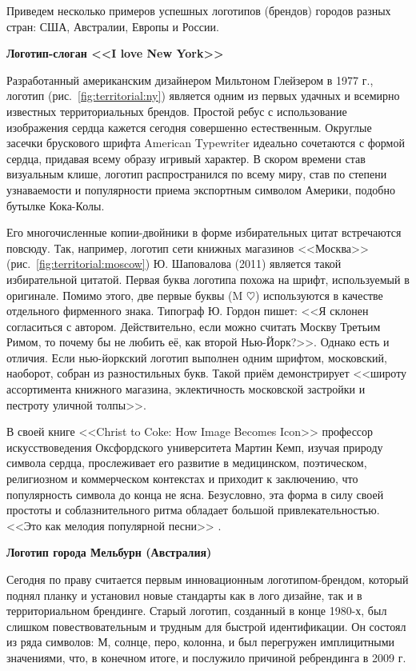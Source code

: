 Приведем несколько примеров успешных логотипов (брендов) городов разных стран: США, Австралии,
Европы и России.

\textbf{Логотип-слоган <<I love New York>>}

Разработанный американским дизайнером Мильтоном Глейзером в 1977 г., логотип
(рис.~\ref{fig:territorial:ny}) является одним из первых удачных и всемирно известных
территориальных брендов. Простой ребус с использование изображения сердца кажется сегодня совершенно
естественным. Округлые засечки брускового шрифта American Typewriter идеально сочетаются с формой
сердца, придавая всему образу игривый характер. В скором времени став визуальным клише, логотип
распространился по всему миру, став по степени узнаваемости и популярности приема экспортным
символом Америки, подобно бутылке Кока-Колы.

Его многочисленные копии-двойники в форме избирательных цитат встречаются повсюду. Так, например,
логотип сети книжных магазинов <<Москва>> (рис.~\ref{fig:territorial:moscow}) Ю. Шаповалова (2011)
является такой избирательной цитатой. Первая буква логотипа похожа на шрифт, используемый в
оригинале. Помимо этого, две первые буквы (M $\heartsuit$) используются в качестве отдельного
фирменного знака. Типограф Ю. Гордон пишет: <<Я склонен согласиться с автором. Действительно, если
можно считать Москву Третьим Римом, то почему бы не любить её, как второй Нью-Йорк?>>.
\autocite[][347]{book:gordon} Однако есть и отличия. Если нью-йоркский логотип выполнен одним
шрифтом, московский, наоборот, собран из разностильных букв. Такой приём демонстрирует <<широту
ассортимента книжного магазина, эклектичность московской застройки и пестроту уличной толпы>>.
\autocite[][347]{book:gordon}

В своей книге <<Christ to Coke: How Image Becomes Icon>> профессор искусствоведения Оксфордского
университета Мартин Кемп, изучая природу символа сердца, прослеживает его развитие в медицинском,
поэтическом, религиозном и коммерческом контекстах и приходит к заключению, что популярность символа
до конца не ясна. Безусловно, эта форма в силу своей простоты и соблазнительного ритма обладает
большой привлекательностью. <<Это как мелодия популярной песни>> \autocite[][110]{kemp2011christ}.

\textbf{Логотип города Мельбурн (Австралия)}

Сегодня по праву считается первым инновационным логотипом-брендом, который поднял планку и установил
новые стандарты  как в лого дизайне, так и в территориальном брендинге. Старый логотип, созданный в
конце 1980-х, был слишком повествовательным и трудным для быстрой идентификации. Он состоял из ряда
символов: М, солнце, перо, колонна, и был перегружен имплицитными значениями, что, в конечном итоге,
и послужило причиной ребрендинга в 2009 г.

